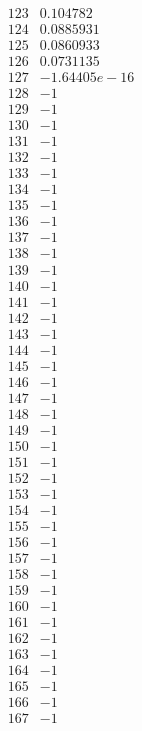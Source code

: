 \documentclass[12pt]{article}
\begin{document}
{$$\begin{array}{|r|r|}
\hline
123 & 0.104782\\
\hline
124 & 0.0885931\\
\hline
125 & 0.0860933\\
\hline
126 & 0.0731135\\
\hline
127 & -1.64405e-16\\
\hline
128 & -1\\
\hline
129 & -1\\
\hline
130 & -1\\
\hline
131 & -1\\
\hline
132 & -1\\
\hline
133 & -1\\
\hline
134 & -1\\
\hline
135 & -1\\
\hline
136 & -1\\
\hline
137 & -1\\
\hline
138 & -1\\
\hline
139 & -1\\
\hline
140 & -1\\
\hline
141 & -1\\
\hline
142 & -1\\
\hline
143 & -1\\
\hline
144 & -1\\
\hline
145 & -1\\
\hline
146 & -1\\
\hline
147 & -1\\
\hline
148 & -1\\
\hline
149 & -1\\
\hline
150 & -1\\
\hline
151 & -1\\
\hline
152 & -1\\
\hline
153 & -1\\
\hline
154 & -1\\
\hline
155 & -1\\
\hline
156 & -1\\
\hline
157 & -1\\
\hline
158 & -1\\
\hline
159 & -1\\
\hline
160 & -1\\
\hline
161 & -1\\
\hline
162 & -1\\
\hline
163 & -1\\
\hline
164 & -1\\
\hline
165 & -1\\
\hline
166 & -1\\
\hline
167 & -1\\

\end{array}$$}
\end{document}
